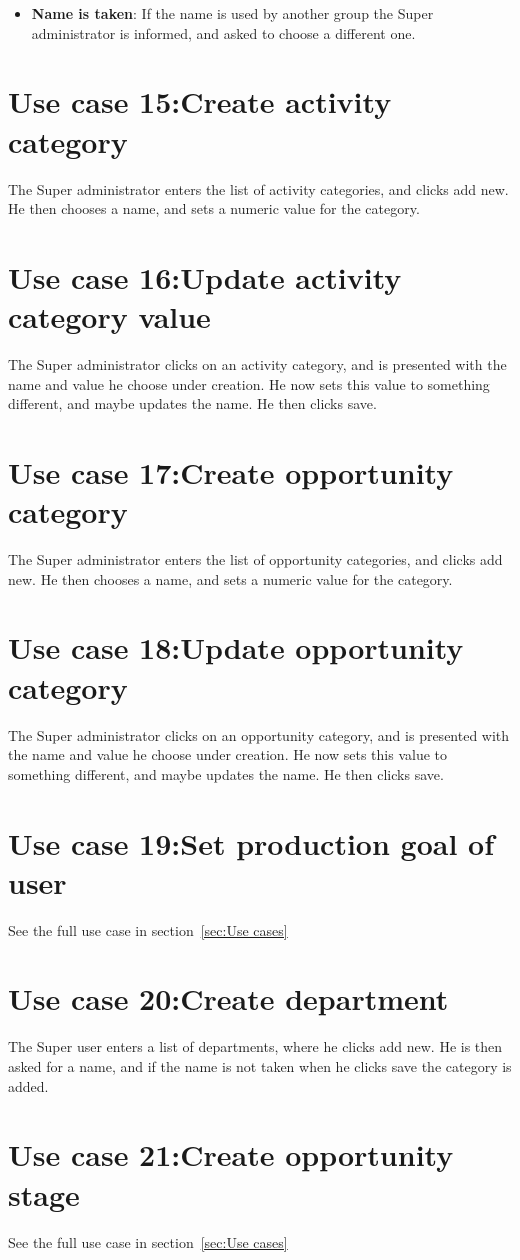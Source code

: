 \begin{itemize}
  \item \textbf{Name is taken}: If the name is used by another group the Super administrator is informed, and asked to choose a different one.
\end{itemize}

\section{Use case 15:Create activity category }
The Super administrator enters the list of activity categories, and clicks add new. He then chooses a name, and sets a numeric value for the category.

\section{Use case 16:Update activity category value }
The Super administrator clicks on an activity category, and is presented with the name and value he choose under creation. He now sets this value to something different, and maybe updates the name. He then clicks save.

\section{Use case 17:Create opportunity category }
The Super administrator enters the list of opportunity categories, and clicks add new. He then chooses a name, and sets a numeric value for the category.


\section{Use case 18:Update opportunity category }
The Super administrator clicks on an opportunity category, and is presented with the name and value he choose under creation. He now sets this value to something different, and maybe updates the name. He then clicks save.

\section{Use case 19:Set production goal of user }
See the full use case in section~\ref{sec:Use cases}

\section{Use case 20:Create department }
The Super user enters a list of departments, where he clicks add new. He is then asked for a name, and if the name is not taken when he clicks save the category is added.

\section{Use case 21:Create opportunity stage }
See the full use case in section~\ref{sec:Use cases}
